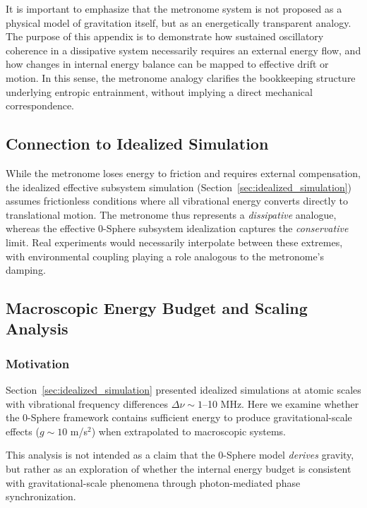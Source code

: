 \documentclass[
 reprint,
 amsmath,amssymb,
 aps,
 prb,
]{revtex4-2}
\numberwithin{equation}{section}
\begin{document}
It is important to emphasize that the metronome system is not proposed as a physical model of gravitation itself, but as an energetically transparent analogy. The purpose of this appendix is to demonstrate how sustained oscillatory coherence in a dissipative system necessarily requires an external energy flow, and how changes in internal energy balance can be mapped to effective drift or motion. In this sense, the metronome analogy clarifies the bookkeeping structure underlying entropic entrainment, without implying a direct mechanical correspondence.

\subsection{Connection to Idealized Simulation}
\label{app:connection}

While the metronome loses energy to friction and requires external compensation, the idealized effective subsystem simulation (Section~\ref{sec:idealized_simulation}) assumes frictionless conditions where all vibrational energy converts directly to translational motion. The metronome thus represents a \textit{dissipative} analogue, whereas the effective 0-Sphere subsystem idealization captures the \textit{conservative} limit. Real experiments would necessarily interpolate between these extremes, with environmental coupling playing a role analogous to the metronome's damping.

\subsection{Macroscopic Energy Budget and Scaling Analysis}
\label{app:macroscopic}

\subsubsection{Motivation}

Section~\ref{sec:idealized_simulation} presented idealized simulations at atomic scales with vibrational frequency differences $\Delta\nu \sim 1$--10 MHz. Here we examine whether the 0-Sphere framework contains sufficient energy to produce gravitational-scale effects ($g \sim 10$ m/s$^2$) when extrapolated to macroscopic systems.

This analysis is not intended as a claim that the 0-Sphere model \textit{derives} gravity, but rather as an exploration of whether the internal energy budget is consistent with gravitational-scale phenomena through photon-mediated phase synchronization.
\end{document}
